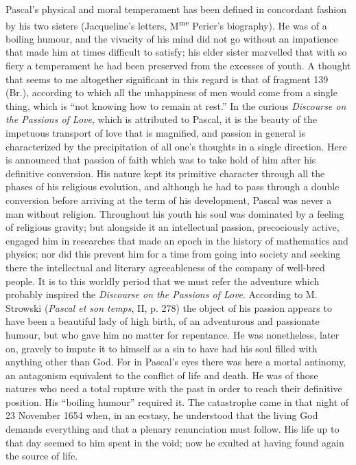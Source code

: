 \documentclass[12pt,a4paper]{article}
\newcommand{\opage}[1]{\marginnote{\footnotesize\textit{[#1]}}}
\begin{document}
\opage{225}Pascal's physical and moral temperament has been defined in concordant fashion
by his two sisters (Jacqueline's letters, M\textsuperscript{me} Perier's
biography). He was of a boiling humour, and the vivacity of his mind did not go
without an impatience that made him at times difficult to satisfy; his elder
sister marvelled that with so fiery a temperament he had been preserved from
the excesses of youth. A thought that seems to me altogether significant in
this regard is that of fragment 139 (Br.), according to which all the unhappiness
of men would come from a single thing, which is ``not knowing how to remain at
rest.'' In the curious \emph{Discourse on the Passions of Love}, which is
attributed to Pascal, it is the beauty of the impetuous transport of love that
is magnified, and passion in general is characterized by the precipitation of
all one's thoughts in a single direction. Here is announced that passion of
faith which was to take hold of him after his definitive conversion. His nature
kept its primitive character through all the phases of his religious evolution,
and although he had to pass through a double conversion before arriving at the
term of his development, Pascal was never a man without religion. Throughout his
youth his soul was dominated by a feeling of religious gravity; but alongside
it an intellectual passion, precociously active, engaged him in researches that
made an epoch in the history of mathematics and physics; nor did this prevent
him for a time from going into society and seeking there the intellectual and
literary agreeableness of the company of well-bred people. It is to this worldly
period that we must refer the adventure which probably inspired the
\emph{Discourse on the Passions of Love}. According to M. Strowski
(\emph{Pascal et son temps}, II, p. 278) the object of his passion appears to
have been a beautiful lady of high birth, of an adventurous and passionate
humour, but who gave him no matter for repentance. He was nonetheless, later
on, gravely to impute it to himself as a sin to have had his soul filled with
anything other than God. For in Pascal's eyes there was here a mortal antinomy,
an antagonism equivalent to the conflict of life and death. He was of those
natures who need a total rupture with the past in order to reach their
definitive position. His ``boiling humour'' required it. The catastrophe came
in that night of 23 November 1654 when, in an ecstasy, he
\opage{226}understood that the living God demands everything and that a plenary
renunciation must follow. His life up to that day seemed to him spent in the
void; now he exulted at having found again the source of life.
\end{document}

